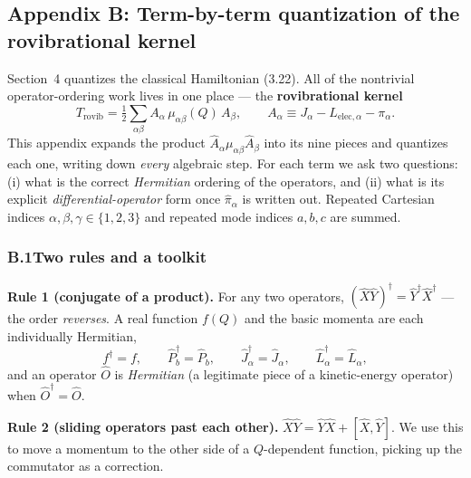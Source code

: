 \subsection*{Appendix B: Term-by-term quantization of the rovibrational kernel}

Section~4 quantizes the classical Hamiltonian (3.22). All of the nontrivial operator-ordering work lives in one place --- the \textbf{rovibrational kernel}
\begin{equation}
T_{\mathrm{rovib}}=\tfrac12\sum_{\alpha\beta}A_\alpha\,\mu_{\alpha\beta}(Q)\,A_\beta,\qquad
A_\alpha\equiv J_\alpha-L_{\mathrm{elec},\alpha}-\pi_\alpha . \tag{B.1}
\end{equation}
This appendix expands the product $\hat A_\alpha\mu_{\alpha\beta}\hat A_\beta$ into its nine pieces and quantizes each one, writing down \emph{every} algebraic step. For each term we ask two questions: (i) what is the correct \emph{Hermitian} ordering of the operators, and (ii) what is its explicit \emph{differential-operator} form once $\hat\pi_\alpha$ is written out. Repeated Cartesian indices $\alpha,\beta,\gamma\in\{1,2,3\}$ and repeated mode indices $a,b,c$ are summed.

\subsubsection*{B.1\quad Two rules and a toolkit}

\textbf{Rule 1 (conjugate of a product).} For any two operators, $(\hat X\hat Y)^{\dagger}=\hat Y^{\dagger}\hat X^{\dagger}$ --- the order \emph{reverses}. A real function $f(Q)$ and the basic momenta are each individually Hermitian,
\begin{equation*}
f^{\dagger}=f,\qquad \hat P_b^{\dagger}=\hat P_b,\qquad \hat J_\alpha^{\dagger}=\hat J_\alpha,\qquad \hat L_\alpha^{\dagger}=\hat L_\alpha ,
\end{equation*}
and an operator $\hat O$ is \emph{Hermitian} (a legitimate piece of a kinetic-energy operator) when $\hat O^{\dagger}=\hat O$.

\textbf{Rule 2 (sliding operators past each other).} $\hat X\hat Y=\hat Y\hat X+[\hat X,\hat Y]$. We use this to move a momentum to the other side of a $Q$-dependent function, picking up the commutator as a correction.

